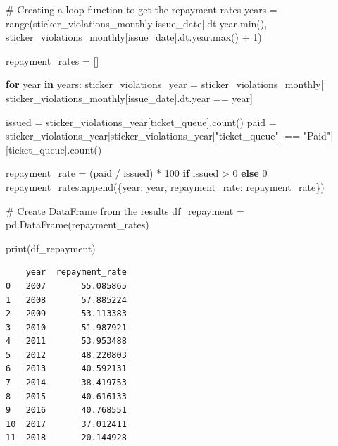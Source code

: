 \documentclass[
  letterpaper,
  DIV=11,
  numbers=noendperiod]{scrartcl}
\newenvironment{Shaded}{\begin{snugshade}}{\end{snugshade}}
\newcommand{\BuiltInTok}[1]{\textcolor[rgb]{0.00,0.23,0.31}{#1}}
\newcommand{\CommentTok}[1]{\textcolor[rgb]{0.37,0.37,0.37}{#1}}
\newcommand{\ControlFlowTok}[1]{\textcolor[rgb]{0.00,0.23,0.31}{\textbf{#1}}}
\newcommand{\DecValTok}[1]{\textcolor[rgb]{0.68,0.00,0.00}{#1}}
\newcommand{\KeywordTok}[1]{\textcolor[rgb]{0.00,0.23,0.31}{\textbf{#1}}}
\newcommand{\NormalTok}[1]{\textcolor[rgb]{0.00,0.23,0.31}{#1}}
\newcommand{\OperatorTok}[1]{\textcolor[rgb]{0.37,0.37,0.37}{#1}}
\newcommand{\StringTok}[1]{\textcolor[rgb]{0.13,0.47,0.30}{#1}}
\begin{document}
\begin{Shaded}
\begin{Highlighting}[]
\CommentTok{\# Creating a loop function to get the repayment rates}
\NormalTok{years }\OperatorTok{=} \BuiltInTok{range}\NormalTok{(sticker\_violations\_monthly[}\StringTok{\textquotesingle{}issue\_date\textquotesingle{}}\NormalTok{].dt.year.}\BuiltInTok{min}\NormalTok{(), }
\NormalTok{              sticker\_violations\_monthly[}\StringTok{\textquotesingle{}issue\_date\textquotesingle{}}\NormalTok{].dt.year.}\BuiltInTok{max}\NormalTok{() }\OperatorTok{+} \DecValTok{1}\NormalTok{)}

\NormalTok{repayment\_rates }\OperatorTok{=}\NormalTok{ []}

\ControlFlowTok{for}\NormalTok{ year }\KeywordTok{in}\NormalTok{ years:}
\NormalTok{    sticker\_violations\_year }\OperatorTok{=}\NormalTok{ sticker\_violations\_monthly[}
\NormalTok{        sticker\_violations\_monthly[}\StringTok{\textquotesingle{}issue\_date\textquotesingle{}}\NormalTok{].dt.year }\OperatorTok{==}\NormalTok{ year]}
    
\NormalTok{    issued }\OperatorTok{=}\NormalTok{ sticker\_violations\_year[}\StringTok{\textquotesingle{}ticket\_queue\textquotesingle{}}\NormalTok{].count()}
\NormalTok{    paid }\OperatorTok{=}\NormalTok{ sticker\_violations\_year[sticker\_violations\_year[}\StringTok{"ticket\_queue"}\NormalTok{] }\OperatorTok{==} \StringTok{"Paid"}\NormalTok{][}\StringTok{\textquotesingle{}ticket\_queue\textquotesingle{}}\NormalTok{].count()}
    
\NormalTok{    repayment\_rate }\OperatorTok{=}\NormalTok{ (paid }\OperatorTok{/}\NormalTok{ issued) }\OperatorTok{*} \DecValTok{100} \ControlFlowTok{if}\NormalTok{ issued }\OperatorTok{\textgreater{}} \DecValTok{0} \ControlFlowTok{else} \DecValTok{0}
\NormalTok{    repayment\_rates.append(\{}\StringTok{\textquotesingle{}year\textquotesingle{}}\NormalTok{: year, }\StringTok{\textquotesingle{}repayment\_rate\textquotesingle{}}\NormalTok{: repayment\_rate\})}

\CommentTok{\# Create DataFrame from the results}
\NormalTok{df\_repayment }\OperatorTok{=}\NormalTok{ pd.DataFrame(repayment\_rates)}

\BuiltInTok{print}\NormalTok{(df\_repayment)}
\end{Highlighting}
\end{Shaded}

\begin{verbatim}
    year  repayment_rate
0   2007       55.085865
1   2008       57.885224
2   2009       53.113383
3   2010       51.987921
4   2011       53.953488
5   2012       48.220803
6   2013       40.592131
7   2014       38.419753
8   2015       40.616133
9   2016       40.768551
10  2017       37.012411
11  2018       20.144928
\end{verbatim}
\end{document}
